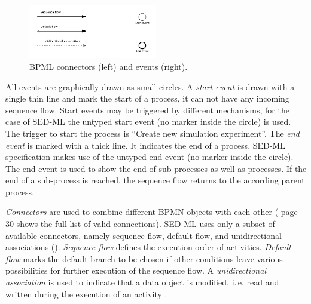\begin{figure}[h]
\centering
\includegraphics[width=0.5\textwidth]{images/connectors.pdf}
\caption{BPML connectors (left) and events (right).}
\label{fig:connectorEvents}
\end{figure}

All events are graphically drawn as small circles. A \emph{start event} is drawn with a single thin line and mark the start of a process, it can not have any incoming sequence flow. Start events may be triggered by different mechanisms, for the case of SED-ML the untyped start event (no marker inside the circle) is used. The trigger to start the process is ``Create new simulation experiment''. The \emph{end event} is marked with a thick line. It indicates the end of a process. SED-ML specification makes use of the untyped end event (no marker inside the circle). The end event is used to show the end of sub-processes as well as processes. If the end of a sub-process is reached, the sequence flow returns to the according parent process.

\emph{Connectors} are used to combine different BPMN objects with each other (\citep{White:2004} page 30 shows the full list of valid connections). SED-ML uses only a subset of available connectors, namely sequence flow, default flow, and unidirectional associations (). \emph{Sequence flow} defines the execution order of activities. \emph{Default flow} marks the default branch to be chosen if other conditions leave various possibilities for further execution of the sequence flow. A \emph{unidirectional association} is used to indicate that a data object is modified, i.\,e. read and written during the execution of an activity \citep{bpmnPoster}.

